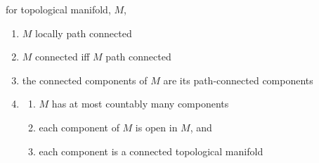 \begin{prop}\label{prop:1.8}\label{prop:01:conn-mani}
  for topological manifold, $M$,
  \begin{enumerate}[label=(\alph*)]
  \item\label{prop:01:conn-mani:lpconn}
    $M$ locally path connected
  \item\label{prop:01:conn-mani:conn-pconn-equiv}
    $M$ connected iff $M$ path connected
  \item\label{prop:01:conn-mani:conn-pconn-comp-equiv}
    the connected components of $M$ are its path-connected components
  \item\label{prop:01:conn-mani:comp}
    \begin{enumerate}[label=(\roman*)]
    \item\label{prop:01:conn-mani:comp:count}
      $M$ has at most countably many components
    \item\label{prop:01:conn-mani:comp:open}
      each component of $M$ is open in $M$, and
    \item\label{prop:01:conn-mani:comp:tm}
      each component is a connected topological manifold
    \end{enumerate}
  \end{enumerate}
\end{prop}

